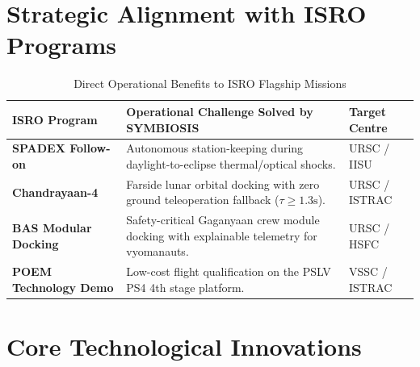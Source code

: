 \documentclass[11pt,a4paper]{article}
\begin{document}
\section{Strategic Alignment with ISRO Programs}

\begin{table}[h!]
\centering
\caption{Direct Operational Benefits to ISRO Flagship Missions}
\label{tab:isro_missions}
\small
\begin{tabularx}{\textwidth}{lXl}
\toprule
\textbf{ISRO Program} & \textbf{Operational Challenge Solved by SYMBIOSIS} & \textbf{Target Centre} \\
\midrule
\textbf{SPADEX Follow-on} & Autonomous station-keeping during daylight-to-eclipse thermal/optical shocks. & URSC / IISU \\
\textbf{Chandrayaan-4} & Farside lunar orbital docking with zero ground teleoperation fallback ($\tau \ge 1.3\text{s}$). & URSC / ISTRAC \\
\textbf{BAS Modular Docking} & Safety-critical Gaganyaan crew module docking with explainable telemetry for vyomanauts. & URSC / HSFC \\
\textbf{POEM Technology Demo} & Low-cost flight qualification on the PSLV PS4 4th stage platform. & VSSC / ISTRAC \\
\bottomrule
\end{tabularx}
\end{table}

\section{Core Technological Innovations}
\end{document}

